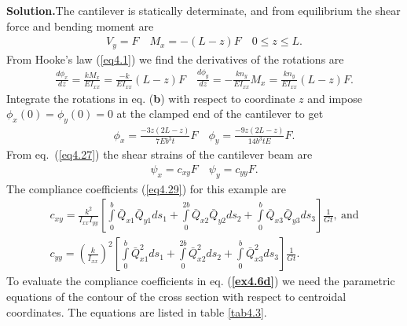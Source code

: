 \documentclass{AeroStructure-ERJohnson}
\begin{document}
\begin{example}
\vspace*{-1\baselineskip}
\noindent\textbf{Solution.}\enspace The cantilever is statically determinate, and from equilibrium the shear force and bending moment are
\begin{align}\label{ex4.6a}
V_{y}=F \quad M_{x}=-(L-z) F \quad 0 \leq z \leq L.
\end{align}
From Hooke's law (\ref{eq4.1}) we find the derivatives of the rotations are
\begin{align}\label{ex4.6b}
\frac{d \phi_{x}}{d z}=\frac{k M_{x}}{E I_{x x}}=\frac{-k}{E I_{x x}}(L-z) F \quad \frac{d \phi_{y}}{d z}=-\frac{k n_{y}}{E I_{x x}} M_{x}=\frac{k n_{y}}{E I_{x x}}(L-z) F.
\end{align}
Integrate the rotations in eq. (\textbf{b}) with respect to coordinate $z$ and impose $\phi_{x}(0)=\phi_{y}(0)=0$ at the clamped end of the cantilever to get
\begin{align}\label{ex4.6c}
\phi_{x}=\frac{-3 z(2 L-z)}{7 E b^{3} t} F \quad \phi_{y}=\frac{-9 z(2 L-z)}{14 b^{3} t E} F.
\end{align}
From eq.~(\ref{eq4.27}) the shear strains of the cantilever beam are
\begin{align}\label{ex4.6d}
\psi_{x}=c_{x y} F \quad \psi_{y}=c_{y y} F.
\end{align}
The compliance coefficients (\ref{eq4.29}) for this example are
\begin{align}
c_{x y}=\frac{k^{2}}{I_{x x} I_{y y}}\left[\int\limits_{0}^{b} \bar{Q}_{x 1} \bar{Q}_{y 1} d s_{1}+\int\limits_{0}^{2b} \bar{Q}_{x 2} \bar{Q}_{y 2} d s_{2}+\int\limits_{0}^{b} \bar{Q}_{x 3} \bar{Q}_{y 3} d s_{3}\right] \frac{1}{G t},\ \text{and}\label{ex4.6e}\\
c_{y y}=\left(\frac{k}{I_{x x}}\right)^{2}\left[\int\limits_{0}^{b} \bar{Q}_{x 1}^{2} d s_{1}+\int\limits_{0}^{2b} \bar{Q}_{x 2}^{2} d s_{2}+\int\limits_{0}^{b} \bar{Q}_{x 3}^{2} d s_{3}\right] \frac{1}{G t}.\label{ex4.6f}
\end{align}
To evaluate the compliance coefficients in eq. (\textbf{\ref{ex4.6d}}) we need the parametric equations of the contour of the cross section with respect to centroidal coordinates. The equations are listed in table \ref{tab4.3}.

\begin{table}[h]\vspace*{4pt}
\vspace*{-10pt}
\end{table}


\end{example}
\end{document}
